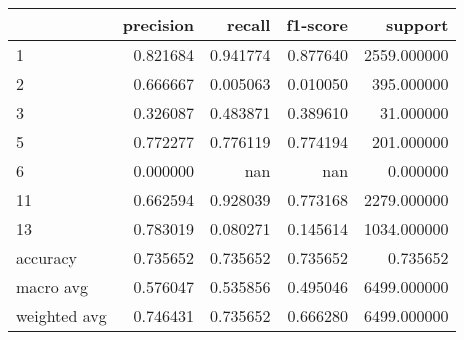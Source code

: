 \begin{tabular}{lrrrr}
\toprule
 & precision & recall & f1-score & support \\
\midrule
1 & 0.821684 & 0.941774 & 0.877640 & 2559.000000 \\
2 & 0.666667 & 0.005063 & 0.010050 & 395.000000 \\
3 & 0.326087 & 0.483871 & 0.389610 & 31.000000 \\
5 & 0.772277 & 0.776119 & 0.774194 & 201.000000 \\
6 & 0.000000 & nan & nan & 0.000000 \\
11 & 0.662594 & 0.928039 & 0.773168 & 2279.000000 \\
13 & 0.783019 & 0.080271 & 0.145614 & 1034.000000 \\
accuracy & 0.735652 & 0.735652 & 0.735652 & 0.735652 \\
macro avg & 0.576047 & 0.535856 & 0.495046 & 6499.000000 \\
weighted avg & 0.746431 & 0.735652 & 0.666280 & 6499.000000 \\
\bottomrule
\end{tabular}
